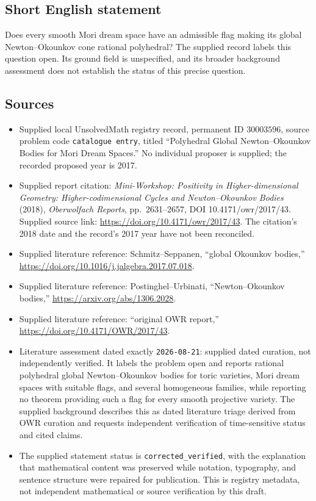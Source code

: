 \documentclass[11pt]{article}
\begin{document}
\subsection{Short English statement}
Does every smooth Mori dream space have an admissible flag making its global Newton--Okounkov cone rational polyhedral? The supplied record labels this question open. Its ground field is unspecified, and its broader background assessment does not establish the status of this precise question.
\subsection{Sources}
\begin{itemize}
\item Supplied local UnsolvedMath registry record, permanent ID \(30003596\), source problem code \texttt{catalogue entry}, titled ``Polyhedral Global Newton--Okounkov Bodies for Mori Dream Spaces.'' No individual proposer is supplied; the recorded proposed year is 2017.
\item Supplied report citation: \emph{Mini-Workshop: Positivity in Higher-dimensional Geometry: Higher-codimensional Cycles and Newton--Okounkov Bodies} (2018), \emph{Oberwolfach Reports}, pp.\ 2631--2657, DOI 10.4171/owr/2017/43. Supplied source link: \url{https://doi.org/10.4171/owr/2017/43}. The citation's 2018 date and the record's 2017 year have not been reconciled.
\item Supplied literature reference: Schmitz--Seppanen, ``global Okounkov bodies,'' \url{https://doi.org/10.1016/j.jalgebra.2017.07.018}.
\item Supplied literature reference: Postinghel--Urbinati, ``Newton--Okounkov bodies,'' \url{https://arxiv.org/abs/1306.2028}.
\item Supplied literature reference: ``original OWR report,'' \url{https://doi.org/10.4171/OWR/2017/43}.
\item Literature assessment dated exactly \texttt{2026-08-21}: supplied dated curation, not independently verified. It labels the problem open and reports rational polyhedral global Newton--Okounkov bodies for toric varieties, Mori dream spaces with suitable flags, and several homogeneous families, while reporting no theorem providing such a flag for every smooth projective variety. The supplied background describes this as dated literature triage derived from OWR curation and requests independent verification of time-sensitive status and cited claims.
\item The supplied statement status is \texttt{corrected\_verified}, with the explanation that mathematical content was preserved while notation, typography, and sentence structure were repaired for publication. This is registry metadata, not independent mathematical or source verification by this draft.
\end{itemize}
\end{document}
